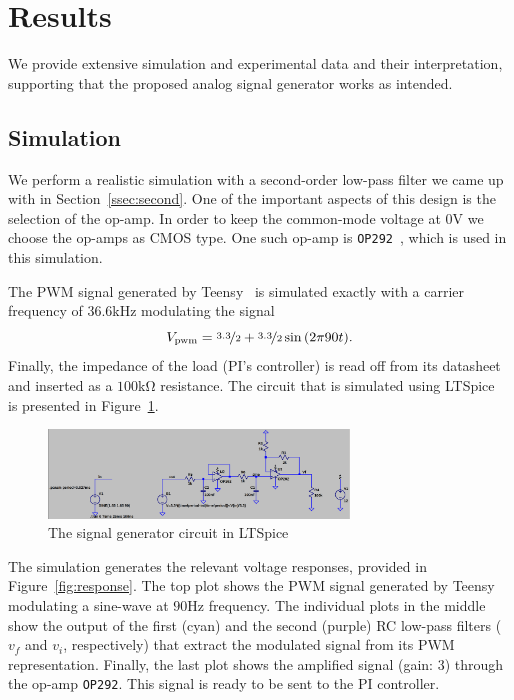 \vspace{-1em}
\section{Results}
\vspace{-1em}

We provide extensive simulation and experimental data and their interpretation,
supporting that the proposed analog signal generator works as intended.

\vspace{-1em}
\subsection{Simulation}
\vspace{-1em}

We perform a realistic simulation with a second-order low-pass filter we came up
with in Section~\ref{ssec:second}. One of the important aspects of this design
is the selection of the op-amp. In order to keep the common-mode voltage at
$0$\unit{\volt} we choose the op-amps as CMOS type. One such op-amp is
\texttt{OP292}~\cite{op292}, which is used in this simulation.

The PWM signal generated by Teensy~\cite{teensy} is simulated exactly with a
carrier frequency of $36.6$\unit{\kilo\hertz} modulating the signal \[
V_{\text{pwm}} = \nicefrac{3.3}{2} + \nicefrac{3.3}{2}\sin{(2\pi 90 t)}.\]
Finally, the impedance of the load (PI's controller) is read off from its
datasheet and inserted as a $100$\unit{\kilo\ohm} resistance. The circuit that
is simulated using LTSpice~\cite{ltspice} is presented in
Figure~\ref{fig:real_sig_gen}.

\begin{figure}[htb] 
\includegraphics[width=8cm]{./figures/circuit.png}
\caption{The signal generator circuit in LTSpice} 
\label{fig:real_sig_gen}
\end{figure}

The simulation generates the relevant voltage responses, provided in
Figure~\ref{fig:response}. The top plot shows the PWM signal generated by Teensy
modulating a sine-wave at $90$\unit{\hertz} frequency. The individual plots in
the middle show the output of the first (cyan) and the second (purple) RC
low-pass filters ($v_f$ and $v_i$, respectively) that extract the modulated
signal from its PWM representation. Finally, the last plot shows the amplified
signal (gain: $3$) through the op-amp \texttt{OP292}. This signal is ready to be
sent to the PI controller.

